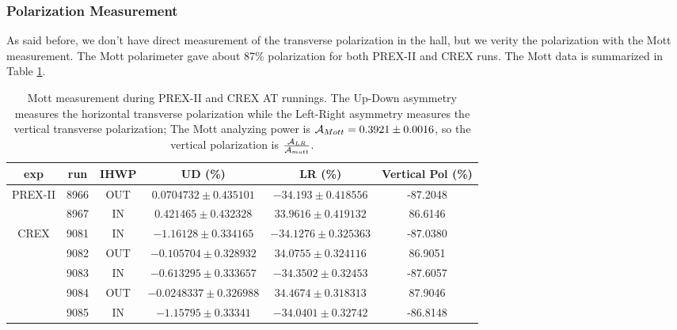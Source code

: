 \subsubsection{Polarization Measurement}
As said before, we don't have direct measurement of the transverse polarization
in the hall, but we verity the polarization with the Mott measurement.
The Mott polarimeter gave about 87\% polarization for both PREX-II and CREX runs.
The Mott data is summarized in Table \ref{tab:AT_Mott}.
\begin{table}[!h]
    \begin{tabular}{c c c | c c | c}
	\hline
	exp & run & IHWP  & UD (\%)	& LR (\%)   & Vertical Pol (\%)	\\
	\hline
	\multirow{2}{*}{PREX-II}
	    & 8966  & OUT   & $0.0704732 \pm 0.435101$	& $-34.193 \pm 0.418556$	& -87.2048  \\
	    & 8967  & IN    & $0.421465 \pm 0.432328$	& $33.9616 \pm 0.419132$	&  86.6146  \\
	\hline
	\multirow{5}{*}{CREX}    
	    & 9081  & IN    & $-1.16128 \pm 0.334165$   & $-34.1276 \pm 0.325363$	& -87.0380  \\
	    & 9082  & OUT   & $-0.105704 \pm 0.328932$	& $34.0755 \pm 0.324116	$&  86.9051  \\
	    & 9083  & IN    & $-0.613295 \pm 0.333657$	& $-34.3502 \pm 0.32453	$& -87.6057  \\
	    & 9084  & OUT   & $-0.0248337 \pm 0.326988$	& $34.4674 \pm 0.318313	$&  87.9046  \\
	    & 9085  & IN    & $-1.15795 \pm 0.33341 $   & $-34.0401 \pm 0.32742	$& -86.8148  \\
	\hline
    \end{tabular}
    \caption{Mott measurement during PREX-II and CREX AT runnings. The Up-Down
    asymmetry measures the horizontal transverse polarization while the Left-Right
    asymmetry measures the vertical transverse polarization; The Mott analyzing 
    power is $\mathcal{A}_{Mott} = 0.3921 \pm 0.0016$, so the vertical polarization is 
    $\frac{\mathcal{A}_{LR}}{\mathcal{A}_{mott}}$.} 
    \label{tab:AT_Mott}
\end{table}

